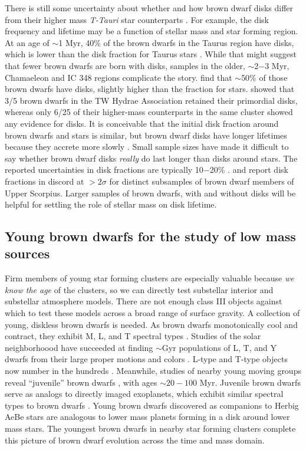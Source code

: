 There is still some uncertainty about whether and how brown dwarf disks differ from their higher mass \emph{T-Tauri} star counterparts \citep{2009ApJ...696..143P}.  For example, the disk frequency and lifetime may be a function of stellar mass and star forming region.  At an age of $\sim$1 Myr, 40\% of the brown dwarfs in the Taurus region have disks, which is lower than the disk fraction for Taurus stars \citep{2006ApJ...645..676L}.  While that might suggest that fewer brown dwarfs are born with disks, samples in the older, $\sim$2$-$3 Myr, Chamaeleon and IC 348 regions complicate the story.  \citet{2005ApJ...631L..69L} find that $\sim$50\% of those brown dwarfs have disks, slightly higher than the fraction for stars.  \citet{2008ApJ...681.1584R} showed that 3/5 brown dwarfs in the TW Hydrae Association retained their primordial disks, whereas only 6/25 of their higher-mass counterparts in the same cluster showed any evidence for disks.  It is conceivable that the initial disk fraction around brown dwarfs and stars is similar, but brown dwarf disks have longer lifetimes because they accrete more slowly \citep{2007ApJ...657..511A}.  Small sample sizes have made it difficult to say whether brown dwarf disks \emph{really} do last longer than disks around stars.  The reported uncertainties in disk fractions are typically 10$-$20\% \citep{2012MNRAS.420.2497R}.  \citet{2007ApJ...660.1517S} and \citet{2009ApJ...705.1173R} report disk fractions in discord at $>2\sigma$ for distinct subsamples of brown dwarf members of Upper Scorpius.  Larger samples of brown dwarfs, with and without disks will be helpful for settling the role of stellar mass on disk lifetime.  

\subsection{Young brown dwarfs for the study of low mass sources}
Firm members of young star forming clusters are especially valuable because \emph{we know the age} of the clusters, so we can directly test substellar interior and substellar atmosphere models.  There are not enough class III objects against which to test these models across a broad range of surface gravity.  A collection of young, diskless brown dwarfs is needed.  As brown dwarfs monotonically cool and contract, they exhibit M, L, and T spectral types \citep{2012ApJS..201...19D}.  Studies of the solar neighborhoood have succeeded at finding $\sim$Gyr populations of L, T, and Y dwarfs from their large proper motions and colors \citep{2011ApJS..197...19K}.  L-type and T-type objects now number in the hundreds \citep{2010AJ....139.1808S,2011ApJS..197...19K}.  Meanwhile, studies of nearby young moving groups reveal ``juvenile'' brown dwarfs \citep{2013ApJ...772...79A}, with ages $\sim20-100$ Myr.  Juvenile brown dwarfs serve as analogs to directly imaged exoplanets, which exhibit similar spectral types to brown dwarfs \citep{2015ApJ...798L...3C}.  Young brown dwarfs discovered as companions to Herbig AeBe stars are analogous to lower mass planets forming in a disk around lower mass stars.  The youngest brown dwarfs in nearby star forming clusters complete this picture of brown dwarf evolution across the time and mass domain.

